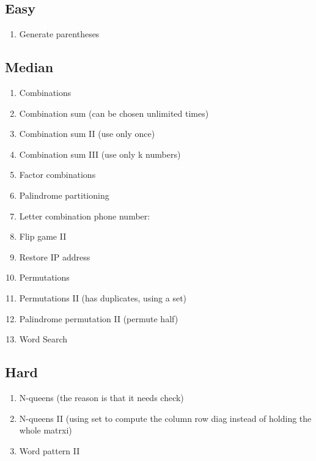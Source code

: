 \documentclass[DIV=calc, paper=a4, fontsize=11pt, twocolumn]{scrartcl}	 %
\begin{document}
\subsection*{Easy}
\begin{enumerate}
\item Generate parentheses
\end{enumerate}

\subsection*{Median}
\begin{enumerate}
\item Combinations \cite{077}
\item Combination sum (can be chosen unlimited times) \cite{039}
\item Combination sum II (use only once) \cite{040}
\item Combination sum III (use only k numbers) \cite{216}
\item Factor combinations \cite{254}
\item Palindrome partitioning \cite{131}
\item Letter combination phone number: \cite{017} 
\item {\color{red} Flip game II} \cite{293} \cite{294} 
\item Restore IP address \cite{093}
\item Permutations \cite{046} 
\item Permutations II (has duplicates, using a set) \cite{047}
\item Palindrome permutation II (permute half) \cite{267}
\item Word Search \cite{079}
\end{enumerate}

\subsection*{Hard}
\begin{enumerate}
\item N-queens (the reason is that it needs check) \cite{051}
\item N-queens II (using set to compute the column row diag instead of holding the whole matrxi) \cite{052}
\item Word pattern II
\end{enumerate}

\end{document}
